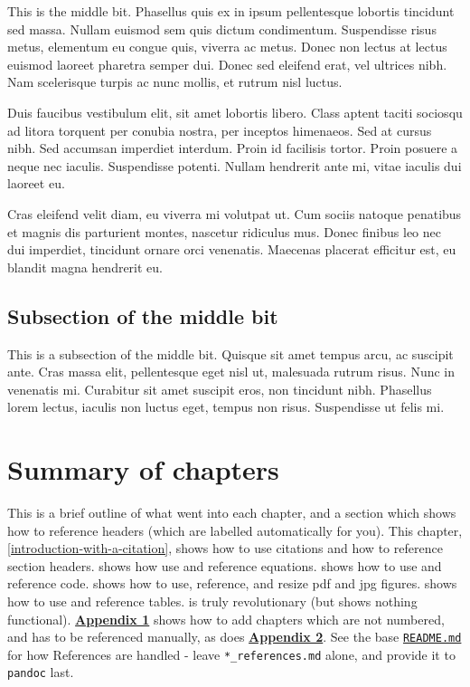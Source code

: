 \documentclass[12pt,a4paper,]{report}
\begin{document}
This is the middle bit. Phasellus quis ex in ipsum pellentesque lobortis
tincidunt sed massa. Nullam euismod sem quis dictum condimentum.
Suspendisse risus metus, elementum eu congue quis, viverra ac metus.
Donec non lectus at lectus euismod laoreet pharetra semper dui. Donec
sed eleifend erat, vel ultrices nibh. Nam scelerisque turpis ac nunc
mollis, et rutrum nisl luctus.

Duis faucibus vestibulum elit, sit amet lobortis libero. Class aptent
taciti sociosqu ad litora torquent per conubia nostra, per inceptos
himenaeos. Sed at cursus nibh. Sed accumsan imperdiet interdum. Proin id
facilisis tortor. Proin posuere a neque nec iaculis. Suspendisse
potenti. Nullam hendrerit ante mi, vitae iaculis dui laoreet eu.

Cras eleifend velit diam, eu viverra mi volutpat ut. Cum sociis natoque
penatibus et magnis dis parturient montes, nascetur ridiculus mus. Donec
finibus leo nec dui imperdiet, tincidunt ornare orci venenatis. Maecenas
placerat efficitur est, eu blandit magna hendrerit eu.

\hypertarget{subsection-of-the-middle-bit}{%
\subsection{Subsection of the middle
bit}\label{subsection-of-the-middle-bit}}

This is a subsection of the middle bit. Quisque sit amet tempus arcu, ac
suscipit ante. Cras massa elit, pellentesque eget nisl ut, malesuada
rutrum risus. Nunc in venenatis mi. Curabitur sit amet suscipit eros,
non tincidunt nibh. Phasellus lorem lectus, iaculis non luctus eget,
tempus non risus. Suspendisse ut felis mi.

\hypertarget{summary-of-chapters}{%
\section{Summary of chapters}\label{summary-of-chapters}}

This is a brief outline of what went into each chapter, and a section
which shows how to reference headers (which are labelled automatically
for you). This chapter, \cref{introduction-with-a-citation}, shows how
to use citations and how to reference section headers.
 shows how use and reference
equations.  shows how to use and
reference code.  shows how to use,
reference, and resize pdf and jpg figures.
 shows how to use and reference
tables.  is truly revolutionary (but shows
nothing functional).
\textbf{\protect\hyperlink{appendix-1-some-extra-stuff}{Appendix 1}}
shows how to add chapters which are not numbered, and has to be
referenced manually, as does
\textbf{\protect\hyperlink{appendix-2-some-more-extra-stuff}{Appendix
2}}. See the base
\href{https://github.com/tompollard/phd_thesis_markdown/blob/master/README.md}{\texttt{README.md}}
for how References are handled - leave \texttt{*\_references.md} alone,
and provide it to \texttt{pandoc} last.
\end{document}
